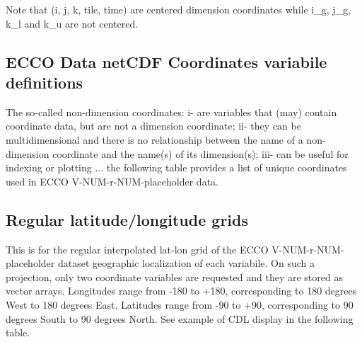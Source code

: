 \par Note that (i, j, k, tile, time) are centered dimension coordinates while i\_g, j\_g, k\_l and k\_u are not centered.

\newpage

\subsection{ECCO Data netCDF Coordinates variabile definitions}
The so-called non-dimension coordinates: i- are variables that (may) contain coordinate data, but are not a dimension coordinate; ii- they can be multidimensional and there is no relationship between the name of a non-dimension coordinate and the name(s) of its dimension(s); iii- can be useful for indexing or plotting ... the following table provides a list of unique coordinates used in ECCO V-NUM-r-NUM-placeholder data.


\subsection*{Regular latitude/longitude grids}
\par This is for the regular interpolated lat-lon grid of the ECCO V-NUM-r-NUM-placeholder dataset geographic localization of each variabile. On such a projection, only two coordinate variables are requested and they are stored as vector arrays. Longitudes range from -180 to +180, corresponding to 180 degrees West to 180 degrees East. Latitudes range from -90 to +90, corresponding to 90 degrees South to 90 degrees North. See example of CDL display in the following table.

